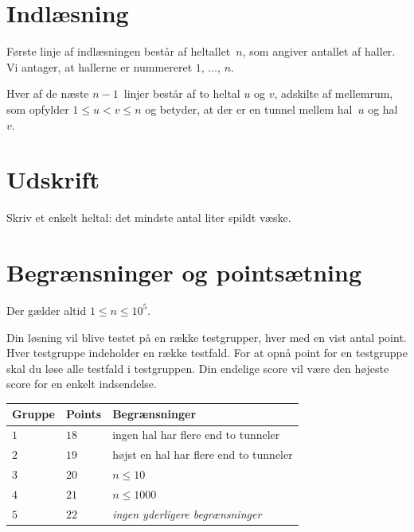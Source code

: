 \section*{Indlæsning}

Første linje af indlæsningen består af heltallet~$n$, som angiver antallet af haller.
Vi antager, at hallerne er nummereret $1$, $\ldots$, $n$.

Hver af de næste $n-1$~linjer består af to heltal $u$ og $v$, adskilte af mellemrum, som opfylder
$1\leq u < v \leq n$ %
og betyder, at der er en tunnel mellem hal~$u$ og hal~$v$.

\section*{Udskrift}

Skriv et enkelt heltal: det mindste antal liter spildt væske.

\section*{Begrænsninger og pointsætning}

Der gælder altid
$1\leq n\leq 10^5$. %

Din løsning vil blive testet på en række testgrupper, hver med en vist antal point.
Hver testgruppe indeholder en række testfald.
For at opnå point for en testgruppe skal du løse alle testfald i testgruppen.
Din endelige score vil være den højeste score for en enkelt indsendelse.

\medskip
\begin{tabular}{lll}
  Gruppe & Points & Begrænsninger \\\hline
  $1$ & $18$ & ingen hal har flere end to tunneler\\
  $2$ & $19$ & højst en hal har flere end to tunneler\\
  $3$ & $20$ & $n\leq 10$\\
  $4$ & $21$ & $n\leq 1000$\\
  $5$ & $22$ & \emph{ingen yderligere begrænsninger}
\end{tabular}
